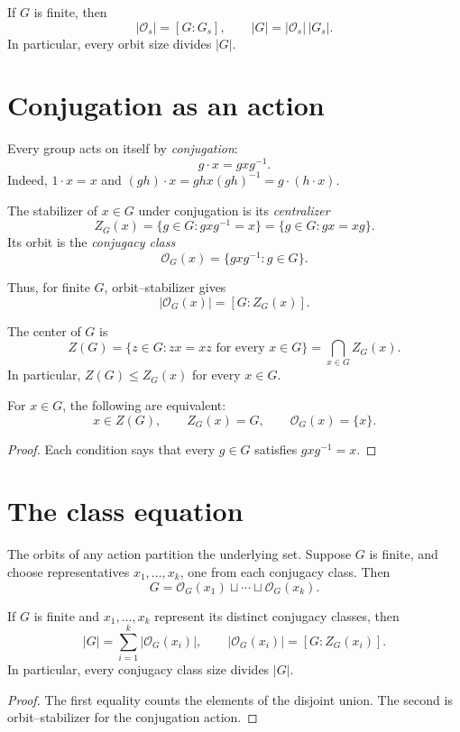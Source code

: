 \documentclass[reqno,11pt]{amsart}
\begin{document}
\begin{corollary}\label{cor:orbit-size}
If $G$ is finite, then
\[
  |\mathcal O_s|=[G:G_s],
  \qquad |G|=|\mathcal O_s|\,|G_s|.
\]
In particular, every orbit size divides $|G|$.
\end{corollary}



\section{Conjugation as an action}

Every group acts on itself by \emph{conjugation}:
\[
  g\cdot x=gxg^{-1}.
\]
Indeed, $1\cdot x=x$ and
$(gh)\cdot x=ghx(gh)^{-1}=g\cdot(h\cdot x)$.


\begin{define}
The stabilizer of $x\in G$ under conjugation is its
\emph{centralizer}
\[
  Z_G(x)=\{g\in G:gxg^{-1}=x\}
        =\{g\in G:gx=xg\}.
\]
Its orbit is the \emph{conjugacy class}
\[
  \mathcal{O}_G(x)=\{gxg^{-1}:g\in G\}.
\]
\end{define}

Thus, for finite $G$, orbit--stabilizer gives
\[
  |\mathcal{O}_G(x)|=[G:Z_G(x)].
\]

The center of $G$ is
\[
  Z(G)=\{z\in G:zx=xz\text{ for every }x\in G\}
      =\bigcap_{x\in G}Z_G(x).
\]
In particular, $Z(G)\leq Z_G(x)$ for every $x\in G$.

\begin{lemma}\label{lem:central-elements}
For $x\in G$, the following are equivalent:
\[
  x\in Z(G),\qquad Z_G(x)=G,\qquad\mathcal{O}_G(x)=\{x\}.
\]
\end{lemma}
\begin{proof}
Each condition says that every $g\in G$ satisfies $gxg^{-1}=x$.
\end{proof}

\section{The class equation}

The orbits of any action partition the underlying set. Suppose $G$ is
finite, and choose representatives $x_1,\ldots,x_k$, one from each
conjugacy class. Then
\[
  G=\mathcal{O}_G(x_1)\sqcup\cdots\sqcup\mathcal{O}_G(x_k).
\]

\begin{theorem}\label{thm:class-equation}
If $G$ is finite and $x_1,\ldots,x_k$ represent its distinct
conjugacy classes, then
\[
  |G|=\sum_{i=1}^k|\mathcal{O}_G(x_i)|,
  \qquad
  |\mathcal{O}_G(x_i)|=[G:Z_G(x_i)].
\]
In particular, every conjugacy class size divides $|G|$.
\end{theorem}
\begin{proof}
The first equality counts the elements of the disjoint union.
The second is orbit--stabilizer for the conjugation action.
\end{proof}
\end{document}
